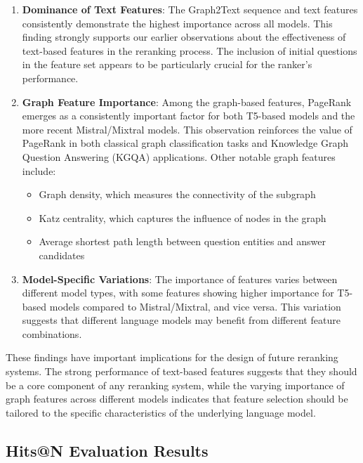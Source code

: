 \begin{enumerate}
    \item \textbf{Dominance of Text Features}: The Graph2Text sequence and text features consistently demonstrate the highest importance across all models. This finding strongly supports our earlier observations about the effectiveness of text-based features in the reranking process. The inclusion of initial questions in the feature set appears to be particularly crucial for the ranker's performance.
    
    \item \textbf{Graph Feature Importance}: Among the graph-based features, PageRank emerges as a consistently important factor for both T5-based models and the more recent Mistral/Mixtral models. This observation reinforces the value of PageRank in both classical graph classification tasks and Knowledge Graph Question Answering (KGQA) applications. Other notable graph features include:
    \begin{itemize}
        \item Graph density, which measures the connectivity of the subgraph
        \item Katz centrality, which captures the influence of nodes in the graph
        \item Average shortest path length between question entities and answer candidates
    \end{itemize}
    
    \item \textbf{Model-Specific Variations}: The importance of features varies between different model types, with some features showing higher importance for T5-based models compared to Mistral/Mixtral, and vice versa. This variation suggests that different language models may benefit from different feature combinations.
\end{enumerate}

These findings have important implications for the design of future reranking systems. The strong performance of text-based features suggests that they should be a core component of any reranking system, while the varying importance of graph features across different models indicates that feature selection should be tailored to the specific characteristics of the underlying language model.

\subsection{Hits@N Evaluation Results}

